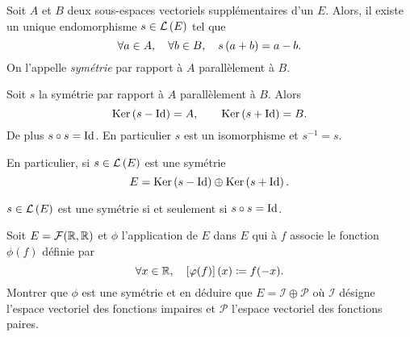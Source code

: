 \documentclass{magnolia}
\begin{document}
\begin{definition}[utile=-3]
Soit $A$ et $B$ deux sous-espaces vectoriels supplémentaires d'un \Kev $E$.
Alors, il existe un unique endomorphisme $s\in\mathcal{L}\left(E\right)$ tel que
\[\forall a\in A ,\quad \forall b\in B ,\quad s\left(a+b\right)=a-b.\]
On l'appelle \emph{symétrie} par rapport à $A$ parallèlement à $B$.
\end{definition}

\begin{proposition}[utile=1]
Soit $s$ la symétrie par rapport à $A$ parallèlement à $B$. Alors
\[\mathop{\rm Ker} \left(s-\operatorname{Id}\right)=A, \qquad \mathop{\rm Ker}\left(s+\operatorname{Id}\right)=B.\]
De plus $s\circ s=\operatorname{Id}$. En particulier $s$ est un isomorphisme et $s^{-1}=s$.
\end{proposition}

\begin{remarqueUnique}
\remarque[utile=1] En particulier, si $s\in\mathcal{L}\left(E\right)$ est une symétrie
  \[E=\mathop{\rm Ker}\left(s-\operatorname{Id}\right)\oplus\mathop{\rm Ker}\left(s+\operatorname{Id}\right).\]
\end{remarqueUnique}

\begin{proposition}[utile=3]
$s\in\mathcal{L}\left(E\right)$ est une symétrie si et seulement si $s\circ s=\operatorname{Id}$.  
\end{proposition}

\begin{exoUnique}
\exo Soit $E=\mathcal{F}(\mathbb{R},\mathbb{R})$ et $\phi$ l'application de $E$ dans $E$
  qui à $f$ associe le fonction $\phi(f)$ définie par
	\[\forall x\in\mathbb{R} ,\quad \left[\varphi(f)\right](x)\coloneqq f(-x).\]
	Montrer que $\phi$ est une symétrie et en déduire
  que $E=\mathcal{I}\oplus\mathcal{P}$ où $\mathcal{I}$ désigne l'espace
  vectoriel des fonctions impaires et $\mathcal{P}$ l'espace vectoriel
  des fonctions paires.
\end{exoUnique}



\end{document}
